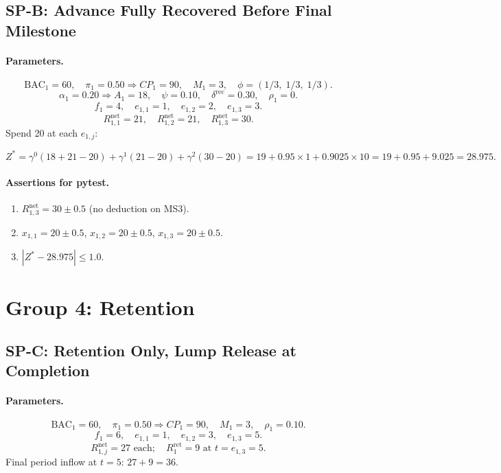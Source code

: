 \documentclass[11pt, a4paper]{article}
\newcommand{\BAC}{\mathrm{BAC}}
\begin{document}
\subsection{SP-B: Advance Fully Recovered Before Final Milestone}

\paragraph{Parameters.}
\[
  \BAC_1=60,\quad\pi_1=0.50\Rightarrow CP_1=90,\quad M_1=3,\quad
  \phi=(1/3,\;1/3,\;1/3).
\]
\[
  \alpha_1=0.20\Rightarrow A_1=18,\quad\psi=0.10,\quad
  \delta^{\mathrm{rec}}=0.30,\quad\rho_1=0.
\]
\[
  f_1=4,\quad e_{1,1}=1,\quad e_{1,2}=2,\quad e_{1,3}=3.
\]
\[
  R_{1,1}^{\mathrm{net}}=21,\quad R_{1,2}^{\mathrm{net}}=21,\quad
  R_{1,3}^{\mathrm{net}}=30.
\]
Spend 20 at each $e_{1,j}$:

\[
  Z^* = \gamma^0(18+21-20)+\gamma^1(21-20)+\gamma^2(30-20)
      = 19 + 0.95\times1 + 0.9025\times10
      = 19+0.95+9.025 = \mathbf{28.975}.
\]

\paragraph{Assertions for pytest.}
\begin{enumerate}[label=A\arabic*.]
  \item $R_{1,3}^{\mathrm{net}}=30\pm0.5$ (no deduction on MS3).
  \item $x_{1,1}=20\pm0.5$, $x_{1,2}=20\pm0.5$, $x_{1,3}=20\pm0.5$.
  \item $|Z^*-28.975|\leq1.0$.
\end{enumerate}

\section{Group 4: Retention}

\subsection{SP-C: Retention Only, Lump Release at Completion}

\paragraph{Parameters.}
\[
  \BAC_1=60,\quad\pi_1=0.50\Rightarrow CP_1=90,\quad M_1=3,\quad
  \rho_1=0.10.
\]
\[
  f_1=6,\quad e_{1,1}=1,\quad e_{1,2}=3,\quad e_{1,3}=5.
\]
\[
  R_{1,j}^{\mathrm{net}}=27\text{ each};\quad
  R_1^{\mathrm{ret}}=9\text{ at }t=e_{1,3}=5.
\]
Final period inflow at $t=5$: $27+9=36$.
\end{document}
